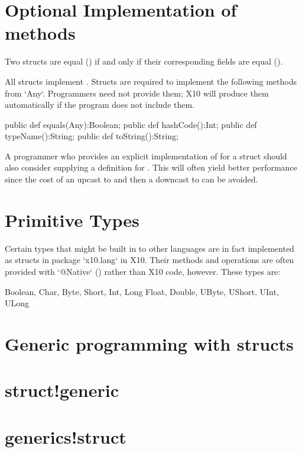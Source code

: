 \section{Optional Implementation of  methods}
\label{StructAnyMethods}

Two
structs are equal (\Xcd{==}) if and only if their corresponding fields
are equal (\Xcd{==}). 

All structs implement . 
Structs are required to implement the following methods from \xcd`Any`.  
Programmers need not provide them; X10 will produce them automatically if 
the program does not include them. 
\begin{xten}
  public def equals(Any):Boolean;
  public def hashCode():Int;
  public def typeName():String;
  public def toString():String;  
\end{xten}


A programmer who provides an explicit implementation
of  for a struct  should also consider
supplying a definition for . This will often
yield better performance since the cost of an upcast to  and
then a downcast to  can be avoided.

\section{Primitive Types}

Certain types that might be built in to other languages are in fact
implemented as structs in package \xcd`x10.lang` in X10. Their methods and
operations are often provided with \xcd`@Native` () rather
than X10 code, however. These types are:
\begin{xten}
Boolean, Char, Byte, Short, Int, Long
Float, Double, UByte, UShort, UInt, ULong
\end{xten}
 
\section{Generic programming with structs}
\section{struct!generic}
\section{generics!struct}

